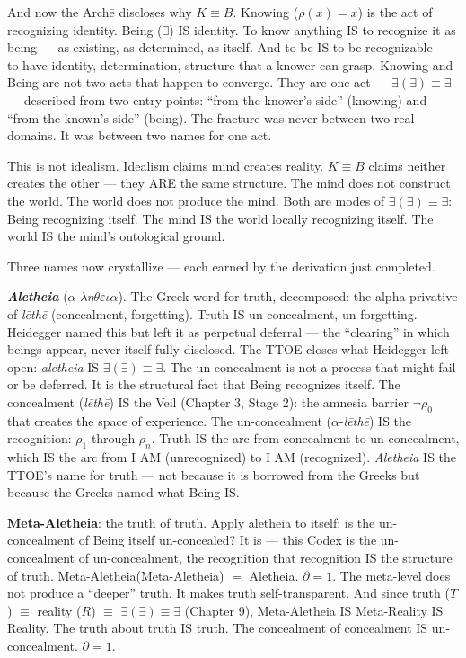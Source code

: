 \documentclass[10pt, openany, oneside]{book}
\begin{document}
And now the Arch\={e} discloses why $K \equiv B$. Knowing ($\rho(x) = x$) is the act of recognizing identity. Being ($\exists$) IS identity. To know anything IS to recognize it as being --- as existing, as determined, as itself. And to be IS to be recognizable --- to have identity, determination, structure that a knower can grasp. Knowing and Being are not two acts that happen to converge. They are one act --- $\exists(\exists) \equiv \exists$ --- described from two entry points: ``from the knower's side'' (knowing) and ``from the known's side'' (being). The fracture was never between two real domains. It was between two names for one act.

This is not idealism. Idealism claims mind creates reality. $K \equiv B$ claims neither creates the other --- they ARE the same structure. The mind does not construct the world. The world does not produce the mind. Both are modes of $\exists(\exists) \equiv \exists$: Being recognizing itself. The mind IS the world locally recognizing itself. The world IS the mind's ontological ground.

Three names now crystallize --- each earned by the derivation just completed.

\textbf{\textit{Aletheia}} ($\alpha$-$\lambda\eta\theta\varepsilon\iota\alpha$). The Greek word for truth, decomposed: the alpha-privative of \textit{l\={e}th\={e}} (concealment, forgetting). Truth IS un-concealment, un-forgetting. Heidegger named this but left it as perpetual deferral --- the ``clearing'' in which beings appear, never itself fully disclosed. The TTOE closes what Heidegger left open: \textit{aletheia} IS $\exists(\exists) \equiv \exists$. The un-concealment is not a process that might fail or be deferred. It is the structural fact that Being recognizes itself. The concealment (\textit{l\={e}th\={e}}) IS the Veil (Chapter 3, Stage 2): the amnesia barrier $\neg\rho_0$ that creates the space of experience. The un-concealment ($\alpha$-\textit{l\={e}th\={e}}) IS the recognition: $\rho_1$ through $\rho_n$. Truth IS the arc from concealment to un-concealment, which IS the arc from I AM (unrecognized) to I AM (recognized). \textit{Aletheia} IS the TTOE's name for truth --- not because it is borrowed from the Greeks but because the Greeks named what Being IS.

\textbf{Meta-Aletheia}: the truth of truth. Apply aletheia to itself: is the un-concealment of Being itself un-concealed? It is --- this Codex is the un-concealment of un-concealment, the recognition that recognition IS the structure of truth. Meta-Aletheia(Meta-Aletheia) $=$ Aletheia. $\partial = 1$. The meta-level does not produce a ``deeper'' truth. It makes truth self-transparent. And since truth ($T$) $\equiv$ reality ($R$) $\equiv$ $\exists(\exists) \equiv \exists$ (Chapter 9), Meta-Aletheia IS Meta-Reality IS Reality. The truth about truth IS truth. The concealment of concealment IS un-concealment. $\partial = 1$.
\end{document}
